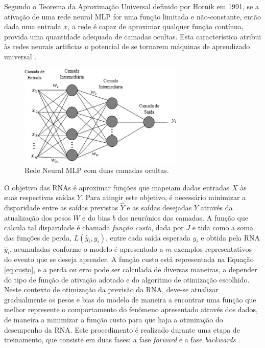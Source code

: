 Segundo o Teorema da Aproximação Universal definido por Hornik em 1991, se a ativação de uma rede neural MLP for uma função limitada e não-constante, então dada uma entrada $x$, a rede é capaz de aproximar qualquer função contínua, provida uma quantidade adequada de camadas ocultas. Esta característica atribui às redes neurais artificias o potencial de se tornarem máquinas de aprendizado universal \cite{hornik1991approximation}.

\begin{figure}[ht]
	\centering
	\caption{Rede Neural MLP com duas camadas ocultas.}
	\label{fig:mlp}
	\includegraphics[width=0.7\textwidth]{img/mlprna.jpg}
\end{figure}

O objetivo das RNAs é aproximar funções que mapeiam dadas entradas $X$ às suas respectivas saídas $Y$. Para atingir este objetivo, é necessário minimizar a disparidade entre as saídas previstas $\hat{Y}$ e as saídas desejadas $Y$  através da atualização dos pesos $W$ e do bias $b$ dos neurônios das camadas. A função que calcula tal disparidade é chamada \emph{função custo}, dada por $J$ e tida como a soma das funções de perda, $L(\hat{y}_i, y_i)$, entre cada saída esperada $y_i$ e obtida pela RNA $\hat{y}_i$, acumuladas conforme o modelo é apresentado a $m$ exemplos representativos do evento que se deseja aprender. A função custo está representada na Equação \ref{eq:custo}, e a perda ou erro pode ser calculada de diversas maneiras, a depender do tipo de função de ativação adotado e do algoritmo de otimização escolhido. Neste contexto de otimização da previsão da RNA, deve-se atualizar gradualmente os pesos e bias do modelo de maneira a encontrar uma função que melhor represente o comportamento do fenômeno apresentado através dos dados, de maneira a minimizar a função custo para que haja a otimização do desempenho da RNA. Este procedimento é realizado durante uma etapa de treinamento, que consiste em duas fases: a fase \emph{forward} e a fase \emph{backwards} \cite{haykin2009neural}.

